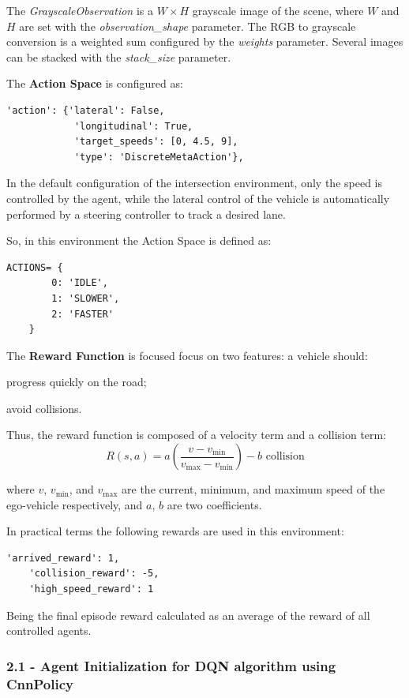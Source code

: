 The \textit{GrayscaleObservation} is a \( W \times H \) grayscale image of the scene, where \( W \) and \( H \) are set with the \textit{observation\_shape} parameter. 
The RGB to grayscale conversion is a weighted sum configured by the \textit{weights} parameter. 
Several images can be stacked with the \textit{stack\_size} parameter.



The \textbf{Action Space} is configured as:

\begin{lstlisting}[style=python]
'action': {'lateral': False,
            'longitudinal': True,
            'target_speeds': [0, 4.5, 9],
            'type': 'DiscreteMetaAction'},
\end{lstlisting}

In the default configuration of the intersection environment, only the speed is controlled by the agent, 
while the lateral control of the vehicle is automatically performed by a steering controller to track a desired lane.

So, in this environment the Action Space is defined as:

\begin{lstlisting}[style=python]
ACTIONS= {
        0: 'IDLE',
        1: 'SLOWER',
        2: 'FASTER'
    }
\end{lstlisting}

The \textbf{Reward Function} is focused focus on two features: a vehicle should:

    progress quickly on the road;

    avoid collisions.

Thus, the reward function is composed of a velocity term and a collision term:
\[
R(s,a) = a \left( \frac{v - v_{\min}}{v_{\max} - v_{\min}} \right) - b \text{ collision}
\]

where \( v \), \( v_{\min} \), and \( v_{\max} \) are the current, minimum, and maximum speed of the ego-vehicle respectively, and \( a \), \( b \) are two coefficients.

In practical terms the following rewards are used in this environment:
\begin{lstlisting}[style=python]
    'arrived_reward': 1,
    'collision_reward': -5,
    'high_speed_reward': 1
\end{lstlisting}

Being the final episode reward calculated as an average of the reward of all controlled agents.

\subsubsection{2.1 - Agent Initialization for DQN algorithm using CnnPolicy}

